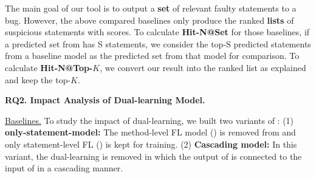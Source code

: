 

The main goal of our tool is to output a {\bf set} of relevant faulty
statements to a bug. However, the above compared baselines only
produce the ranked {\bf lists} of suspicious statements with scores.
%
To calculate \textbf{Hit-N@Set} for those baselines, if a predicted
set from {\tool} has S statements, we consider the top-S predicted
statements from a baseline model as the predicted set from that model
for comparison.
%
To calculate {\bf Hit-N@Top-$K$}, we convert our result into
the ranked list as explained and keep the top-$K$.





{\bf RQ2. Impact Analysis of Dual-learning Model.}

\underline{Baselines.} To study the impact of dual-learning, we built two variants of {\tool}: 
(1) \textbf{only-statement-model:} The method-level FL model
() is removed from {\tool} and only statement-level FL
() is kept for training. (2) \textbf{Cascading model:} In
this variant, the dual-learning is removed in which the output
of  is connected to the input of  in a
cascading manner.


